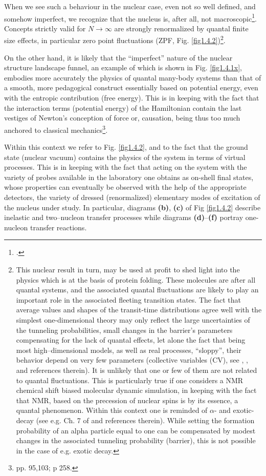 When we see such a behaviour in the nuclear case, even not so well defined, and somehow imperfect, we recognize that the nucleus is, after all, not macroscopic\footnote{\cite{Anderson:72}.}. Concepts strictly valid for $N\rightarrow\infty$ are strongly renormalized by quantal finite size effects, in particular zero point fluctuations (ZPF, Fig. \ref{fig1.4.2})\footnote{This nuclear result in turn, may be used at profit to shed light into the physics which is at the basis of protein folding. These molecules are after all quantal systems, and the associated quantal fluctuations are likely to play an important role in the associated fleeting transition states. The fact that average values and shapes of the transit-time distributions agree well with the simplest one-dimensional theory may only reflect the large uncertainties of the tunneling probabilities, small changes in the barrier's parameters compensating for the lack of quantal effects, let alone the fact that being most high--dimensional models, as well as real processes, ``sloppy'', their behavior depend on very few parameters (collective variables (CV), see \cite{Buchanan:15}, \cite{Transtrum:15}, and references therein). It is unlikely that one or few of them are not  related to quantal fluctuations. This is particularly true if one considers a NMR chemical shift biased molecular dynamic simulation, in keeping with the fact that NMR, based  on the precession of nuclear spins is by its essence, a quantal phenomenon. Within this context one is reminded of $\alpha$- and exotic-decay (see e.g. Ch. 7 of \cite{Brink:05} and references therein). While setting the formation probability of an alpha particle equal to one  can be compensated by modest changes in the associated tunneling probability (barrier), this is not possible in the case of e.g. exotic decay.}.

On the other hand, it is likely that the ``imperfect'' nature of the nuclear structure landscape funnel, an example of which is shown in Fig. \ref{fig1.4.1x}, embodies more accurately the physics of quantal many-body systems than that of a smooth, more pedagogical construct essentially based on potential energy, even with the entropic contribution (free energy). This is in keeping with the fact that the interaction terms (potential energy) of the Hamiltonian contain the last vestiges of Newton's conception of force or, causation, being thus too much anchored to classical mechanics\footnote{\cite{Born:48} pp. 95,103; \cite{Pais:86} p 258.}.

Within this context we refer to Fig. \ref{fig1.4.2}, and to the fact that the ground state (nuclear vacuum)  contains the physics of the system in terms of virtual processes. This is in keeping with  the fact that acting on  the system with the variety of probes available in the laboratory one obtains as on-shell final states, whose properties can eventually be observed with the help of the appropriate detectors, the variety of dressed (renormalized) elementary modes of excitation of the nucleus under study. In particular, diagrams \textbf{(b)}, \textbf{(c)} of Fig \ref{fig1.4.2} describe inelastic and two--nucleon transfer processes while diagrams  \textbf{(d)}--\textbf{(f)} portray  one-nucleon transfer reactions. 


